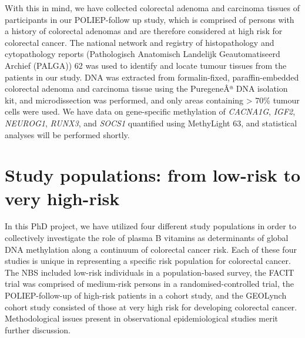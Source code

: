 \noindent With this in mind, we have collected colorectal adenoma and carcinoma tissues of participants in our POLIEP-follow up study, which is comprised of persons with a history of colorectal adenomas and are therefore considered at high risk for colorectal cancer. The national network and registry of histopathology and cytopathology reports (Pathologisch Anatomisch Landelijk Geautomatiseerd Archief (PALGA)) 62 was used to identify and locate tumour tissues from the patients in our study. DNA was extracted from formalin-fixed, paraffin-embedded colorectal adenoma and carcinoma tissue using the PuregeneÂª DNA isolation kit, and microdissection was performed, and only areas containing > 70\% tumour cells were used. We have data on gene-specific methylation of \emph{CACNA1G}, \emph{IGF2}, \emph{NEUROG1}, \emph{RUNX3}, and \emph{SOCS1} quantified using MethyLight 63, and statistical analyses will be performed shortly. 
 
\section{Study populations: from low-risk to very high-risk} %
In this PhD project, we have utilized four different study populations in order to collectively investigate the role of plasma B vitamins as determinants of global DNA methylation along a continuum of colorectal cancer risk. Each of these four studies is unique in representing a specific risk population for colorectal cancer. The NBS included low-risk individuals in a population-based survey, the FACIT trial was comprised of medium-risk persons in a randomised-controlled trial, the POLIEP-follow-up of high-risk patients in a cohort study, and the GEOLynch cohort study consisted of those at very high risk for developing colorectal cancer. Methodological issues present in observational epidemiological studies merit further discussion. 
 

